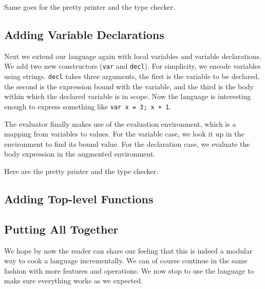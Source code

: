 Same goes for the pretty printer and the type checker.



\subsection{Adding Variable Declarations}

Next we extend our language again with local variables and variable
declarations. We add two new constructors (\lstinline{var} and
\lstinline{decl}).
For simplicity, we encode variables using strings. \lstinline{decl} takes three
arguments, the first is the variable to be declared, the second is the
expression bound with the variable, and the third is the body within which the
declared variable is in scope. Now the language is interesting enough to express
something like \lstinline{var x = 3; x + 1}.

The evaluator finally makes use of the evaluation environment, which is a
mapping from variables to values.
For the variable case, we look it up in the environment to find its bound value.
For the declaration case, we evaluate the body expression in the augmented
environment.

Here are the pretty printer and the type checker.


\subsection{Adding Top-level Functions}


\subsection{Putting All Together}

We hope by now the reader can share our feeling that this is indeed a modular
way to cook a language incrementally. We can of course continue in the same
fashion with more features and operations. We now stop to use the language to
make sure everything works as we expected.

